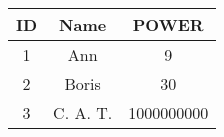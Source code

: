 \documentclass{article}
\begin{document}
\begin{table}[h]
\centering
\begin{tabular}{ | c | c | c | }
\hline
ID & Name & POWER \\
\hline
1 & Ann & 9 \\
\hline
2 & Boris & 30 \\
\hline
3 & C. A. T. & 1000000000 \\
\hline
\end{tabular}
\label{tab:example}
\end{table}
\end{document}
